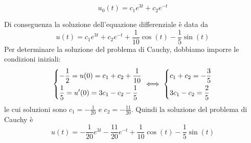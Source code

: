 \begin{example}
\begin{enumerate}[(i)]
        \[
        u_0(t) = c_1 e^{3t}+c_2 e^{-t}
        \]
    \end{enumerate}
    Di conseguenza la soluzione dell'equazione differenziale è data da
    \[
    u(t) = c_1 e^{3t}+c_2 e^{-t} +\frac{1}{10}\cos(t)-\frac{1}{5}\sin(t)
    \]
    Per determinare la soluzione del problema di Cauchy, dobbiamo imporre le condizioni iniziali:
    \[
    \begin{dcases}
        -\frac{1}{2} = u(0) = c_1 +c_2 +\frac{1}{10}\\
        \frac{1}{5} = u'(0) = 3c_1 -c_2 -\frac{1}{5}
    \end{dcases} \iff \begin{dcases}
        c_1 + c_2 = -\frac{3}{5}\\
        3c_1 -c_2 = \frac{2}{5}
    \end{dcases}
    \]
    le cui soluzioni sono $c_1 = -\frac{1}{20}$ e $c_2 = -\frac{11}{20}$. Quindi la soluzione del problema di Cauchy è
    \[
    u(t) = -\frac{1}{20}e^{3t} -\frac{11}{20}e^{-t}+\frac{1}{10}\cos(t)-\frac{1}{5}\sin(t)
    \]
\end{example}

